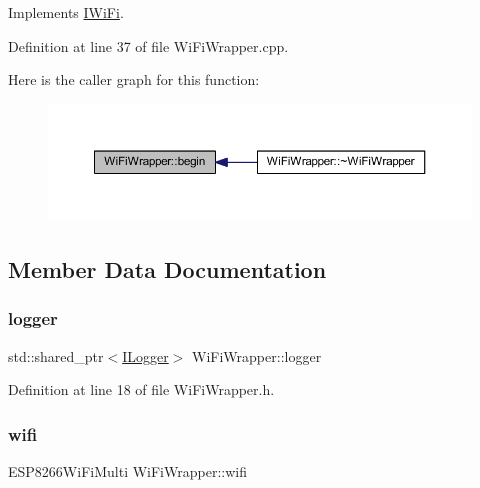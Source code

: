 Implements \hyperlink{class_i_wi_fi_a84af90ca78639bda7a1a72f670cfc27b}{I\+Wi\+Fi}.



Definition at line 37 of file Wi\+Fi\+Wrapper.\+cpp.

Here is the caller graph for this function\+:\nopagebreak
\begin{figure}[H]
\begin{center}
\leavevmode
\includegraphics[width=350pt]{class_wi_fi_wrapper_a6d2ace1968e0f9b04f690e66679dae0c_icgraph}
\end{center}
\end{figure}


\subsection{Member Data Documentation}
\mbox{\label{class_wi_fi_wrapper_aed67f566d96f9e0a9a668ec03bbb4764}} 
\subsubsection{\texorpdfstring{logger}{logger}}
{\footnotesize\ttfamily std\+::shared\+\_\+ptr$<$\hyperlink{class_i_logger}{I\+Logger}$>$ Wi\+Fi\+Wrapper\+::logger\hspace{0.3cm}{\ttfamily [private]}}



Definition at line 18 of file Wi\+Fi\+Wrapper.\+h.

\mbox{\label{class_wi_fi_wrapper_afcf4e83ce32f98305ef5616fc0df499b}} 
\subsubsection{\texorpdfstring{wifi}{wifi}}
{\footnotesize\ttfamily E\+S\+P8266\+Wi\+Fi\+Multi Wi\+Fi\+Wrapper\+::wifi\hspace{0.3cm}{\ttfamily [private]}}



